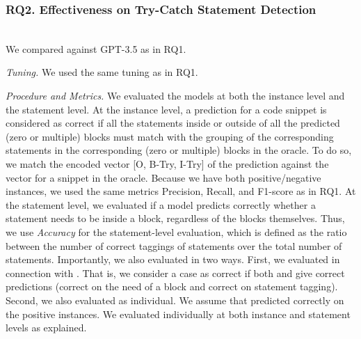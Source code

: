 \subsubsection{RQ2. Effectiveness on Try-Catch Statement Detection}~\\
 We compared {\xstate} against GPT-3.5 as in RQ1.



{\em Tuning.} We used the same tuning as in RQ1.

{\em Procedure and Metrics.} We evaluated the models at both the
instance level and the statement level. At the instance level, a
prediction for a code snippet is considered as correct if all the
statements inside or outside of all the predicted (zero or
multiple)  blocks must match with the grouping of the
corresponding statements in the corresponding (zero or
multiple)  blocks in the oracle. To do so, we match
the encoded vector [O, B-Try, I-Try] of the prediction against the
vector for a snippet in the oracle. Because we have both
positive/negative instances, we used the same metrics Precision,
Recall, and F1-score as in RQ1. At the statement level, we evaluated
if a model predicts correctly whether a statement needs to be inside
a  block, regardless of the blocks themselves. Thus,
we use {\em Accuracy} for the statement-level evaluation, which is
defined as the ratio between the number of correct taggings of
statements over the total number of statements.  Importantly, we also
evaluated {\tool} in two ways. First, we evaluated {\xstate} in
connection with {\xblock}. That is, we consider a case as correct if
both {\xblock} and {\xstate} give correct predictions (correct on the
need of a  block and correct on statement
tagging). Second, we also evaluated {\xstate} as individual. We assume
that {\xblock} predicted correctly on the positive instances. We
evaluated {\xstate} individually at both instance and statement levels
as explained.


